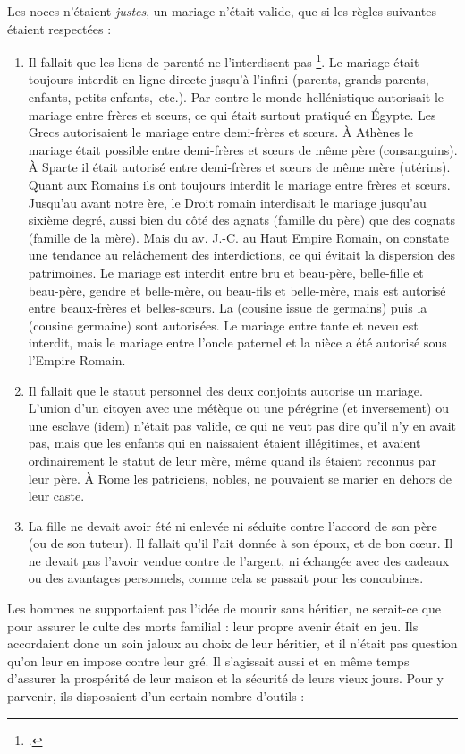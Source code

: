 Les noces n'étaient \emph{justes}, un mariage n'était valide, que si les règles
suivantes étaient respectées :
\begin{enumerate}
\item Il fallait que les liens de parenté ne l'interdisent pas%
\footcite[92]{levi2002}.
Le mariage
était toujours interdit en ligne directe jusqu'à l'infini (parents,
grands-parents, enfants, petits-enfants,~etc.). Par contre le monde hellénistique
autorisait le mariage entre frères et sœurs, ce qui était surtout
pratiqué en Égypte. Les Grecs autorisaient le mariage entre demi-frères et
sœurs. À Athènes le mariage était possible entre demi-frères et sœurs de
même père (consanguins). À Sparte il était autorisé entre demi-frères et
sœurs de même mère (utérins). Quant aux Romains ils ont toujours interdit
le mariage entre frères et sœurs. Jusqu'au  avant notre
ère, le Droit romain interdisait le mariage jusqu'au sixième degré, aussi
bien du côté des agnats (famille du père) que des cognats (famille de la
mère). Mais du  av. J.-C. au Haut Empire Romain, on constate
une tendance au relâchement des interdictions, ce qui évitait la
dispersion des patrimoines. Le mariage est interdit entre bru et beau-père,
belle-fille et beau-père, gendre et belle-mère, ou beau-fils et belle-mère,
mais est autorisé entre beaux-frères et belles-sœurs. La 
(cousine issue de germains) puis la  (cousine germaine) sont
autorisées. Le mariage entre tante et neveu est interdit, mais le mariage
entre l'oncle paternel et la nièce a été autorisé sous l'Empire Romain.
\item Il fallait que le statut personnel des deux conjoints autorise un
mariage. L'union d'un citoyen avec une métèque ou une pérégrine (et inversement)
ou une esclave (idem) n'était pas valide, ce qui ne veut pas dire
qu'il n'y en avait pas, mais que les enfants qui en naissaient étaient illégitimes,
et avaient ordinairement le statut de leur mère, même quand ils
étaient reconnus par leur père. À Rome les patriciens, nobles, ne pouvaient
se marier en dehors de leur caste.
\item La fille ne devait avoir été ni enlevée ni séduite contre l'accord
de son père (ou de son tuteur). Il fallait qu'il l'ait donnée à son époux, et
de bon cœur. Il ne devait pas l'avoir vendue contre de l'argent, ni échangée
avec des cadeaux ou des avantages personnels, comme cela se passait
pour les concubines.
\end{enumerate}
Les hommes ne supportaient pas l'idée de mourir sans héritier, ne
serait-ce que pour assurer le culte des morts familial : leur propre avenir
 était en jeu. Ils accordaient donc un soin jaloux au choix de
leur héritier, et il n'était pas question qu'on leur en impose contre leur
gré. Il s'agissait aussi et en même temps d'assurer la prospérité de leur
maison et la sécurité de leurs vieux jours. Pour y parvenir, ils disposaient
d'un certain nombre d'outils :

